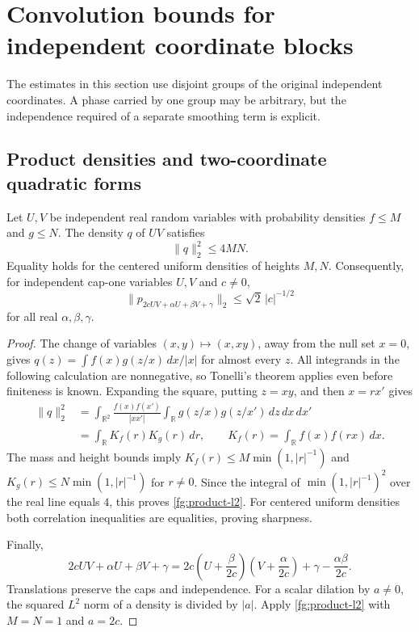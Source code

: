 \section{Convolution bounds for independent coordinate blocks}
\label{sec:gluing}

The estimates in this section use disjoint groups of the original
independent coordinates.  A phase carried by one group may be arbitrary,
but the independence required of a separate smoothing term is explicit.

\subsection{Product densities and two-coordinate quadratic forms}

\begin{lemma}\label{fg:product}
Let $U,V$ be independent real random variables with probability
densities $f\leq M$ and $g\leq N$.  The density $q$ of $UV$ satisfies
\begin{equation}\label{fg:product-l2}
 \|q\|_2^2\leq4MN.
\end{equation}
Equality holds for the centered uniform densities of heights $M,N$.
Consequently, for independent cap-one variables $U,V$ and $c\ne0$,
\begin{equation}\label{fg:edge-l2}
 \|p_{2cUV+\alpha U+\beta V+\gamma}\|_2
 \leq\sqrt2\,|c|^{-1/2}
\end{equation}
for all real $\alpha,\beta,\gamma$.
\end{lemma}

\begin{proof}
The change of variables $(x,y)\mapsto(x,xy)$, away from the
null set $x=0$, gives
$q(z)=\int f(x)g(z/x)\,dx/|x|$ for almost every $z$.
All integrands in the following calculation are nonnegative,
so Tonelli's theorem applies even before finiteness is known.
Expanding the square, putting $z=xy$, and then $x=rx'$ gives
\begin{align*}
 \|q\|_2^2
 &=\int_{\mathbb R^2}\frac{f(x)f(x')}{|xx'|}
       \int_{\mathbb R}g(z/x)g(z/x')\,dz\,dx\,dx'\\
 &=\int_{\mathbb R}K_f(r)K_g(r)\,dr,\qquad
 K_f(r)=\int_{\mathbb R}f(x)f(rx)\,dx .
\end{align*}
The mass and height bounds imply
$K_f(r)\leq M\min(1,|r|^{-1})$ and
$K_g(r)\leq N\min(1,|r|^{-1})$ for $r\ne0$.
Since the integral of $\min(1,|r|^{-1})^2$ over the real line
equals $4$, this proves \eqref{fg:product-l2}.
For centered uniform densities both correlation inequalities
are equalities, proving sharpness.

Finally,
\[
 2cUV+\alpha U+\beta V+\gamma
 =2c\left(U+\frac{\beta}{2c}\right)
       \left(V+\frac{\alpha}{2c}\right)
        +\gamma-\frac{\alpha\beta}{2c}.
\]
Translations preserve the caps and independence.
For a scalar dilation by $a\ne0$, the squared $L^2$ norm of a
density is divided by $|a|$.  Apply \eqref{fg:product-l2}
with $M=N=1$ and $a=2c$.
\end{proof}

